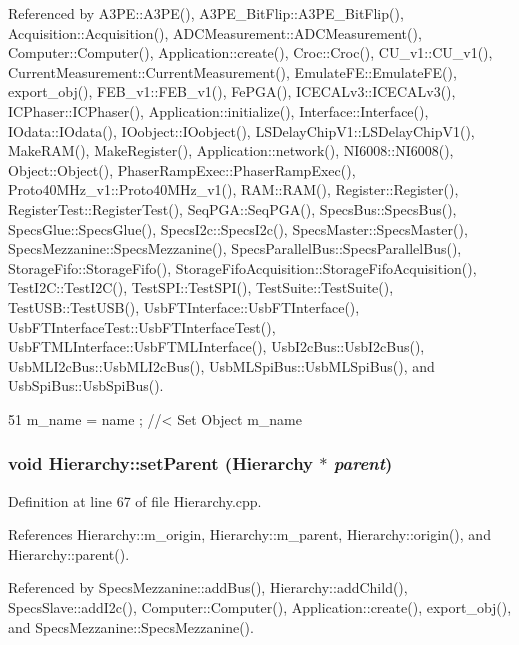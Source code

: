 Referenced by A3PE::A3PE(), A3PE\_\-BitFlip::A3PE\_\-BitFlip(), Acquisition::Acquisition(), ADCMeasurement::ADCMeasurement(), Computer::Computer(), Application::create(), Croc::Croc(), CU\_\-v1::CU\_\-v1(), CurrentMeasurement::CurrentMeasurement(), EmulateFE::EmulateFE(), export\_\-obj(), FEB\_\-v1::FEB\_\-v1(), FePGA(), ICECALv3::ICECALv3(), ICPhaser::ICPhaser(), Application::initialize(), Interface::Interface(), IOdata::IOdata(), IOobject::IOobject(), LSDelayChipV1::LSDelayChipV1(), MakeRAM(), MakeRegister(), Application::network(), NI6008::NI6008(), Object::Object(), PhaserRampExec::PhaserRampExec(), Proto40MHz\_\-v1::Proto40MHz\_\-v1(), RAM::RAM(), Register::Register(), RegisterTest::RegisterTest(), SeqPGA::SeqPGA(), SpecsBus::SpecsBus(), SpecsGlue::SpecsGlue(), SpecsI2c::SpecsI2c(), SpecsMaster::SpecsMaster(), SpecsMezzanine::SpecsMezzanine(), SpecsParallelBus::SpecsParallelBus(), StorageFifo::StorageFifo(), StorageFifoAcquisition::StorageFifoAcquisition(), TestI2C::TestI2C(), TestSPI::TestSPI(), TestSuite::TestSuite(), TestUSB::TestUSB(), UsbFTInterface::UsbFTInterface(), UsbFTInterfaceTest::UsbFTInterfaceTest(), UsbFTMLInterface::UsbFTMLInterface(), UsbI2cBus::UsbI2cBus(), UsbMLI2cBus::UsbMLI2cBus(), UsbMLSpiBus::UsbMLSpiBus(), and UsbSpiBus::UsbSpiBus().


\begin{DoxyCode}
51 { m_name  = name  ; } //< Set Object m_name
\end{DoxyCode}
\hypertarget{classHierarchy_a585ad1aeec16077a0e532ab8b4fc557b}{
\subsubsection[{setParent}]{\setlength{\rightskip}{0pt plus 5cm}void Hierarchy::setParent ({\bf Hierarchy} $\ast$ {\em parent})}}
\label{classHierarchy_a585ad1aeec16077a0e532ab8b4fc557b}


Definition at line 67 of file Hierarchy.cpp.

References Hierarchy::m\_\-origin, Hierarchy::m\_\-parent, Hierarchy::origin(), and Hierarchy::parent().

Referenced by SpecsMezzanine::addBus(), Hierarchy::addChild(), SpecsSlave::addI2c(), Computer::Computer(), Application::create(), export\_\-obj(), and SpecsMezzanine::SpecsMezzanine().


